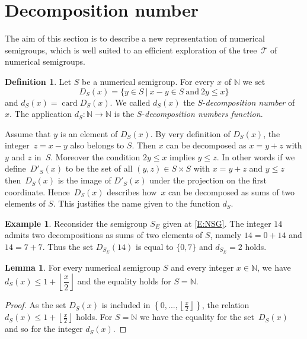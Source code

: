 \documentclass[reqno]{amsart}
\theoremstyle{plain}
\theoremstyle{definition}
\newtheorem{defi}[prop]{Definition}
\newtheorem{exam}[prop]{Example}
\newtheorem{lem}[prop]{Lemma}
\renewcommand{\leq}{\leqslant}
\newcommand{\NN}{\mathbb{N}}
\DeclareMathOperator{\card}{card}
\begin{document}
\section{Decomposition number}
\label{S:DecNumber}

The aim of this section is to describe a new representation of numerical semigroups,
which is well suited to an efficient exploration of the tree~$\mathcal{T}$ of numerical semigroups. 

\begin{defi}
Let $S$ be a numerical semigroup.
For every $x$ of $\NN$  we set
\[
D_S(x)=\{y \in S\ |\ x-y\in S\ \text{and}\ 2y\leq x\}
\]
and $d_S(x)=\card D_S(x)$.
We called $d_S(x)$ the $S$-\emph{decomposition number} of~$x$.
The application $d_S:\NN\to\NN$ is the $S$-\emph{decomposition numbers function}.
\end{defi}

Assume that $y$ is an element of $D_S(x)$.
By very definition of $D_S(x)$, the integer~$z=x-y$ also belongs to $S$. 
Then $x$ can be decomposed as $x=y+z$ with $y$ and $z$ in~$S$. 
Moreover the condition $2y\leq x$ implies $y\leq z$. 
In other words if we define~$D'_S(x)$ to be the set of all $(y,z)\in S\times S$ with $x=y+z$ and $y\leq z$ then~$D_S(x)$ is the image of $D'_S(x)$ under the projection on the first coordinate.
 Hence~$D_S(x)$ describes how~$x$ can be decomposed as sums of two elements of $S$.
 This justifies the name given to the function $d_S$.
 
\begin{exam}
Reconsider the semigroup $S_E$ given at \eqref{E:NSG}.
The integer $14$ admits two decompositions as sums of two elements of $S$, namely $14=0+14$ and $14=7+7$. 
Thus the set $D_{S_E}(14)$ is equal to $\{0,7\}$ and $d_{S_E}=2$ holds.
\end{exam}


\begin{lem}
\label{L:RepN}
For every numerical semigroup $S$ and every integer $x\in \NN$,  we have $d_S(x)\leq 1+\left\lfloor \dfrac{x}2\right\rfloor$ and the equality holds for $S=\NN$.
\end{lem}

\begin{proof}
As the set $D_S(x)$ is included in $\left\{0,...,\left\lfloor\frac x2\right\rfloor\right\}$, the relation $d_S(x)\leq 1+\left\lfloor \frac{x}2\right\rfloor$ holds.
For $S=\NN$ we have the equality for the set~$D_S(x)$ and so for the integer $d_S(x)$.
\end{proof}
\end{document}
